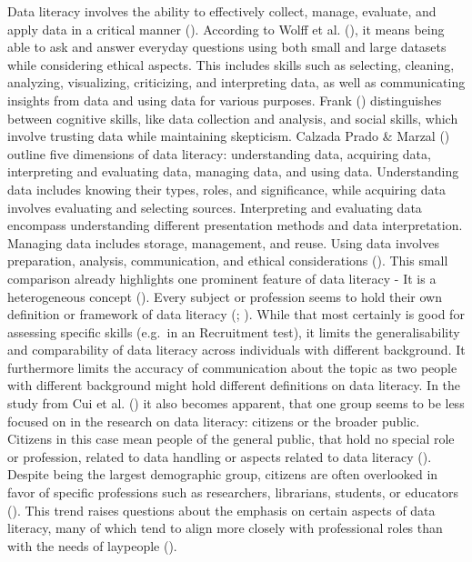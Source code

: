 \documentclass[
  12pt,
  a4paper,
  twoside]{article}
\begin{document}
Data literacy involves the ability to effectively collect, manage, evaluate, and apply data in a critical manner (). According to Wolff et al. (), it means being able to ask and answer everyday questions using both small and large datasets while considering ethical aspects. This includes skills such as selecting, cleaning, analyzing, visualizing, criticizing, and interpreting data, as well as communicating insights from data and using data for various purposes. Frank () distinguishes between cognitive skills, like data collection and analysis, and social skills, which involve trusting data while maintaining skepticism. Calzada Prado \& Marzal () outline five dimensions of data literacy: understanding data, acquiring data, interpreting and evaluating data, managing data, and using data. Understanding data includes knowing their types, roles, and significance, while acquiring data involves evaluating and selecting sources. Interpreting and evaluating data encompass understanding different presentation methods and data interpretation. Managing data includes storage, management, and reuse. Using data involves preparation, analysis, communication, and ethical considerations ().
This small comparison already highlights one prominent feature of data literacy - It is a heterogeneous concept (). Every subject or profession seems to hold their own definition or framework of data literacy (; ). While that most certainly is good for assessing specific skills (e.g.~in an Recruitment test), it limits the generalisability and comparability of data literacy across individuals with different background. It furthermore limits the accuracy of communication about the topic as two people with different background might hold different definitions on data literacy. In the study from Cui et al. () it also becomes apparent, that one group seems to be less focused on in the research on data literacy: citizens or the broader public. Citizens in this case mean people of the general public, that hold no special role or profession, related to data handling or aspects related to data literacy ().
Despite being the largest demographic group, citizens are often overlooked in favor of specific professions such as researchers, librarians, students, or educators (). This trend raises questions about the emphasis on certain aspects of data literacy, many of which tend to align more closely with professional roles than with the needs of laypeople ().
\end{document}
